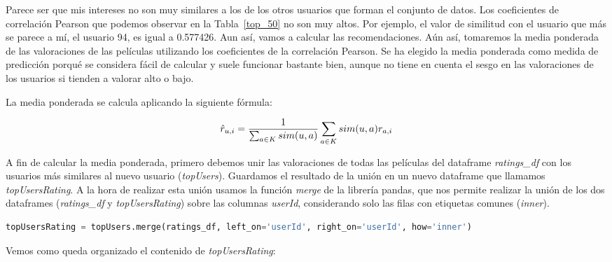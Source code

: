 \documentclass{uimppracticas}
\begin{document}
Parece ser que mis intereses no son muy similares a los de los otros usuarios que forman el conjunto de datos. Los coeficientes de correlación Pearson que podemos observar en la Tabla~\ref{top_50} no son muy altos. Por ejemplo, el valor de similitud con el usuario que más se parece a mí, el usuario 94, es igual a 0.577426. Aun así, vamos a calcular las recomendaciones. Aún así, tomaremos la media ponderada de las valoraciones de las películas utilizando los coeficientes de la correlación Pearson. Se ha elegido la media ponderada como medida de predicción porqué se considera fácil de calcular y suele funcionar bastante bien, aunque no tiene en cuenta el sesgo en las valoraciones de los usuarios si tienden a valorar alto o bajo. 

La media ponderada se calcula aplicando la siguiente fórmula:

\begin{equation}\label{media_ponderada}
	\large \hat{r}_{u,i} = \frac{1}{\sum_{a\in K}sim(u,a)} \sum_{a\in K }sim(u,a) r_{a,i}
\end{equation}

A fin de calcular la media ponderada, primero debemos unir las valoraciones de todas las películas del dataframe \textit{ratings\_df} con los usuarios más similares al nuevo usuario (\textit{topUsers}). Guardamos el resultado de la unión en un nuevo dataframe que llamamos \textit{topUsersRating}. A la hora de realizar esta unión usamos la función \textit{merge} de la librería pandas, que nos permite realizar la unión de los dos dataframes (\textit{ratings\_df} y \textit{topUsersRating}) sobre las columnas \textit{userId}, considerando solo las filas con etiquetas comunes (\textit{inner}). 

\newpage

\begin{lstlisting}[language=python, basicstyle=\footnotesize]
topUsersRating = topUsers.merge(ratings_df, left_on='userId', right_on='userId', how='inner')
\end{lstlisting}

Vemos como queda organizado el contenido de \textit{topUsersRating}:
\end{document}
